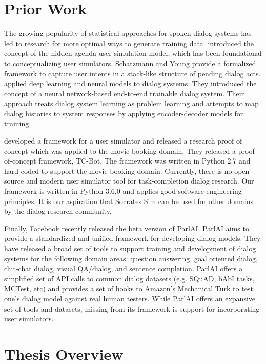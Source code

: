 \section{Prior Work}
\label{sec:priorworks}

The growing popularity of statistical approaches for spoken dialog systems has led to research for more optimal ways to generate training data. \cite{Schatzmann2009TheHA} introduced the concept of the hidden agenda user simulation model, which has been foundational to conceptualizing user simulators. Schatzmann and Young provide a formalized framework to capture user intents in a stack-like structure of pending dialog acts. \cite{BordesW16} applied deep learning and neural models to dialog systems. They introduced the concept of a neural network-based end-to-end trainable dialog system. Their approach treats dialog system learning as problem learning and attempts to map dialog histories to system responses by applying encoder-decoder models for training. 

\cite{li_usersim} developed a framework for a user simulator and released a research proof of concept which was applied to the movie booking domain. They released a proof-of-concept framework, TC-Bot. The framework was written in Python 2.7 and hard-coded to support the movie booking domain. Currently, there is no open source and modern user simulator tool for task-completion dialog research. Our framework is written in Python 3.6.0 and applies good software engineering principles. It is our aspiration that Socrates Sim can be used for other domains by the dialog research community. 

Finally, Facebook recently released the beta version of ParlAI. ParlAI aims to provide a standardized and unified framework for developing dialog models. They have released a broad set of tools to support training and development of dialog systems for the following domain areas: question answering, goal oriented dialog, chit-chat dialog, visual QA/dialog, and sentence completion. ParlAI offers a simplified set of API calls to common dialog datasets (e.g. SQuAD, bAbI tasks, MCTest, etc) and provides a set of hooks to Amazon's Mechanical Turk to test one’s dialog model against real human testers. While ParlAI offers an expansive set of tools and datasets, missing from its framework is support for incorporating user simulators. 

\section{Thesis Overview}


